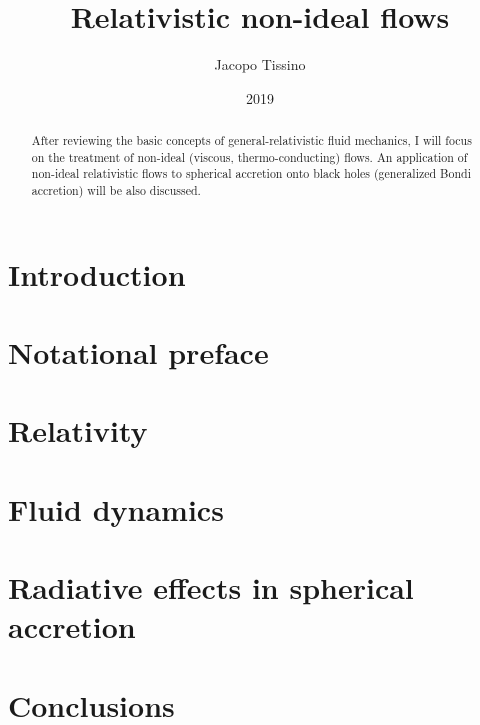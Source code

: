 \documentclass[a4paper, 11pt]{article}
\title{Relativistic non-ideal flows}
\author{Jacopo Tissino}
\date{2019}
\begin{document}



\begin{abstract}
After reviewing the basic concepts of general-relativistic fluid mechanics, I will focus on the treatment of non-ideal
(viscous, thermo-conducting) flows. An application of non-ideal relativistic flows to spherical accretion onto black holes
(generalized Bondi accretion) will be also discussed.
\end{abstract}

\setcounter{tocdepth}{2}
\tableofcontents

\section{Introduction} \label{sec:introduction}


\section{Notational preface} \label{sec:notational-preface}


\section{Relativity} \label{sec:general-relativity}


\section{Fluid dynamics} \label{sec:fluid-dynamics}


\section{Radiative effects in spherical accretion} \label{sec:radiative-effects}


% 

\section{Conclusions} \label{sec:conclusions}


\printbibliography[title={Bibliography}]

\end{document}
